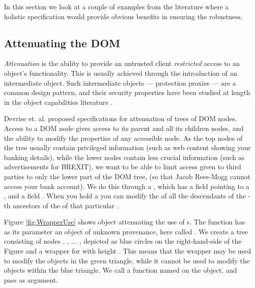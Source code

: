 In this section we look at a couple of examples from the literature where a holistic specification would provide obvious benefits in ensuring the robustness.
\subsection{Attenuating the DOM}
\label{sect:example:DOM}

\emph{Attenuation} is the ability to provide an untrusted client \emph{restricted}  access to an object's functionality. This is usually achieved through the introduction of an intermediate object. Such intermediate objects --- protection proxies \cite{gof} --- are a common design pattern, and their security properties have been studied at length in the object capabilities literature \cite{MillerPhD,murray10-infoflow}.

Devrise et. al. proposed specifications for attenuation of trees of DOM \cite{dd} nodes.
Access to a DOM node
gives access to its parent and all its children nodes, and the ability to
modify the properties of any accessible node. As the top nodes of the
tree usually contain privileged information (such as web content
showing your banking details), while the lower nodes contain less
crucial information (such as advertisements for BREXIT), we want to be
able to limit access given to third parties to only the lower part of
the DOM tree, (so that Jacob Rees-Mogg cannot access your bank
account). We do this through a , which has
a field  pointing to a , and a field .
When you hold
a  you can modify the  of all the
descendants of the -th ancestors of the  of that
particular . 


Figure \ref{fig:WrapperUse} shows
 object attenuating the use of 
s.
The
function  has as its parameter an object of unknown
provenance, here called . We create a tree
consisting of nodes , , ... , depicted as blue
circles on the right-hand-side of the Figure and a
wrapper for  with height . This means that the
wrapper  may be used to modify
 the objects in the green triangle, while it cannot be used to
modify the objects within the
blue triangle.  We call a function named  on
the  object, and pass  as argument.

